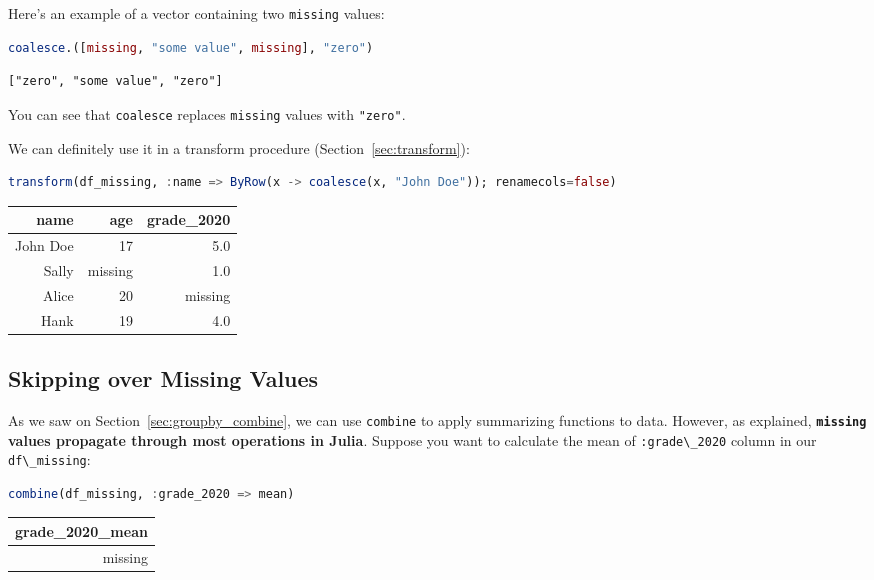 \documentclass[
  notoc %
]{tufte-book}
\newcommand{\passthrough}[1]{#1}
\begin{document}
Here's an example of a vector containing two
\passthrough{\lstinline!missing!} values:

\begin{lstlisting}[language=Julia]
coalesce.([missing, "some value", missing], "zero")
\end{lstlisting}

\begin{lstlisting}[language=Output]
["zero", "some value", "zero"]
\end{lstlisting}

You can see that \passthrough{\lstinline!coalesce!} replaces
\passthrough{\lstinline!missing!} values with
\passthrough{\lstinline!"zero"!}.

We can definitely use it in a transform procedure
(Section~\ref{sec:transform}):

\begin{lstlisting}[language=Julia]
transform(df_missing, :name => ByRow(x -> coalesce(x, "John Doe")); renamecols=false)
\end{lstlisting}

\begin{longtable}[]{@{}rrr@{}}
\toprule()
name & age & grade\_2020 \\
\midrule()
\endhead
John Doe & 17 & 5.0 \\
Sally & missing & 1.0 \\
Alice & 20 & missing \\
Hank & 19 & 4.0 \\
\bottomrule()
\end{longtable}

\hypertarget{sec:missing_skip}{%
\subsection{Skipping over Missing Values}\label{sec:missing_skip}}

As we saw on Section~\ref{sec:groupby_combine}, we can use
\passthrough{\lstinline!combine!} to apply summarizing functions to
data. However, as explained, \textbf{\passthrough{\lstinline!missing!}
values propagate through most operations in Julia}. Suppose you want to
calculate the mean of \passthrough{\lstinline!:grade\_2020!} column in
our \passthrough{\lstinline!df\_missing!}:

\begin{lstlisting}[language=Julia]
combine(df_missing, :grade_2020 => mean)
\end{lstlisting}

\begin{longtable}[]{@{}r@{}}
\toprule()
grade\_2020\_mean \\
\midrule()
\endhead
missing \\
\bottomrule()
\end{longtable}
\end{document}
